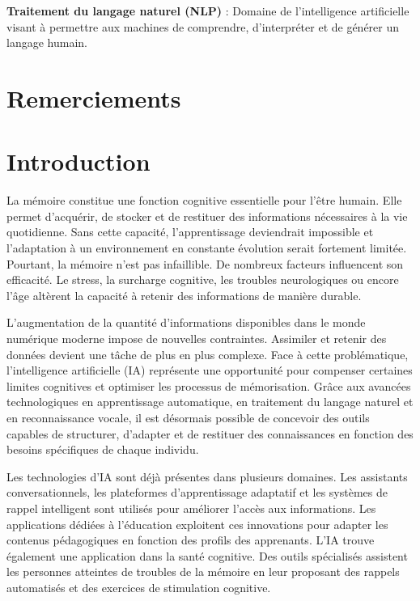 \documentclass[12pt,a4paper]{report}
\begin{document}
\textbf{Traitement du langage naturel (NLP)} : Domaine de l'intelligence artificielle visant à permettre aux machines de comprendre, d'interpréter et de générer un langage humain.

\chapter*{Remerciements}

\chapter*{Introduction}

La mémoire constitue une fonction cognitive essentielle pour l'être humain. Elle permet d'acquérir, de stocker et de restituer des informations nécessaires à la vie quotidienne. Sans cette capacité, l'apprentissage deviendrait impossible et l'adaptation à un environnement en constante évolution serait fortement limitée. Pourtant, la mémoire n'est pas infaillible. De nombreux facteurs influencent son efficacité. Le stress, la surcharge cognitive, les troubles neurologiques ou encore l'âge altèrent la capacité à retenir des informations de manière durable.

L'augmentation de la quantité d'informations disponibles dans le monde numérique moderne impose de nouvelles contraintes. Assimiler et retenir des données devient une tâche de plus en plus complexe. Face à cette problématique, l'intelligence artificielle (IA) représente une opportunité pour compenser certaines limites cognitives et optimiser les processus de mémorisation. Grâce aux avancées technologiques en apprentissage automatique, en traitement du langage naturel et en reconnaissance vocale, il est désormais possible de concevoir des outils capables de structurer, d'adapter et de restituer des connaissances en fonction des besoins spécifiques de chaque individu.

Les technologies d'IA sont déjà présentes dans plusieurs domaines. Les assistants conversationnels, les plateformes d'apprentissage adaptatif et les systèmes de rappel intelligent sont utilisés pour améliorer l'accès aux informations. Les applications dédiées à l'éducation exploitent ces innovations pour adapter les contenus pédagogiques en fonction des profils des apprenants. L'IA trouve également une application dans la santé cognitive. Des outils spécialisés assistent les personnes atteintes de troubles de la mémoire en leur proposant des rappels automatisés et des exercices de stimulation cognitive.
\end{document}
